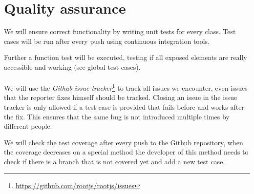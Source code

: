\chapter{Quality assurance}
We will ensure correct functionality by writing unit tests for every class. Test cases will be run after every push using continuous integration tools.

Further a function test will be executed, testing if all exposed elements are really accessible and working (see global test cases).
\\\\

We will use the \textit{Github issue tracker}\footnote{\url{https://github.com/rootjs/rootjs/issues}} to track all issues we encounter, even issues that the reporter fixes himself should be tracked.
Closing an issue in the issue tracker is only allowed if a test case is provided that fails before and works after the fix. This ensures that the same bug is not introduced multiple times by different people.

We will check the test coverage after every push to the Github repository, when the coverage decreases on a special method the developer of this method needs to check if there is a branch that is not covered yet and add a new test case.
